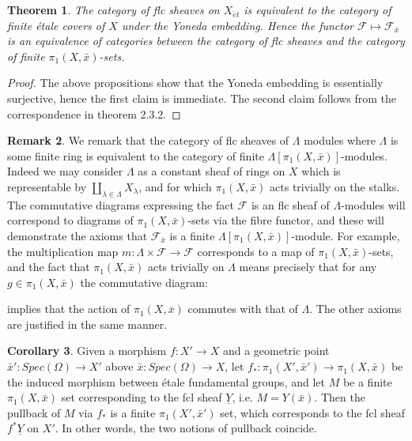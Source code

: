 \documentclass{ucbthesis}
\newtheorem{thm}{Theorem}[section]
\theoremstyle{definition}
\newtheorem{rmk}[thm]{Remark}
\theoremstyle{theorem}
\newtheorem{cor}[thm]{Corollary}
\begin{document}
\begin{thm}
The category of flc sheaves on $X_{\acute{e}t}$ is equivalent to the category of finite \'{e}tale covers of $X$ under the Yoneda embedding. Hence the functor $\mathcal{F}\mapsto \mathcal{F}_{\bar{x}}$ is an equivalence of categories between the category of flc sheaves and the category of finite $\pi_{1}(X,\bar{x})$-sets. 
\end{thm}
\begin{proof}
The above propositions show that the Yoneda embedding is essentially surjective, hence the first claim is immediate. The second claim follows from the correspondence in theorem 2.3.2.
\end{proof}

\begin{rmk} We remark that the category of flc sheaves of $\Lambda$ modules where $\Lambda$ is some finite ring is equivalent to the category of finite $\Lambda[\pi_{1}(X,\bar{x})]$-modules. Indeed we may consider $\Lambda$ as a constant sheaf of rings on $X$ which is representable by $\coprod\limits_{\lambda \in \Lambda} X_{\lambda}$, and for which $\pi_{1}(X,\bar{x})$ acts trivially on the stalks. The commutative diagrams expressing the fact $\mathcal{F}$ is an flc sheaf of $\Lambda$-modules will correspond to diagrams of $\pi_{1}(X,\bar{x})$-sets via the fibre functor, and these will demonstrate the axioms that $\mathcal{F}_{\bar{x}}$ is a finite $\Lambda[\pi_{1}(X,\bar{x})]$-module. For example, the multiplication map $m: \Lambda \times \mathcal{F} \rightarrow \mathcal{F}$ corresponds to a map of $\pi_{1}(X,\bar{x})$-sets, and the fact that $\pi_{1}(X,\bar{x})$ acts trivially on $\Lambda$ means precisely that for any $g\in \pi_{1}(X,\bar{x})$ the commutative diagram:

\begin{center}
\end{center}

implies that the action of $\pi_{1}(X,\bar{x})$ commutes with that of $\Lambda$. The other axioms are justified in the same manner. 
\end{rmk}

\begin{cor}
Given a morphism $f:X'\rightarrow X$ and a geometric point $\bar{x}':Spec(\Omega) \rightarrow X'$ above
 $\bar{x}:Spec(\Omega) \rightarrow X$, let $f_{*}:\pi_{1}(X',\bar{x}') \rightarrow \pi_{1}(X,\bar{x})$ be
  the induced morphism between \'{e}tale fundamental groups, and let $M$ be a finite $\pi_{1}(X,\bar{x})$ set
   corresponding to the fcl sheaf $\underline{Y}$, i.e. $M= Y(\bar{x})$. Then the pullback of $M$ via $f_{*}$
    is a finite $\pi_{1}(X',\bar{x}')$ set, which corresponds to the fcl sheaf $f^{*}\underline{Y}$ on $X'$.
     In other words, the two notions of pullback coincide. 
\end{cor}
\end{document}
